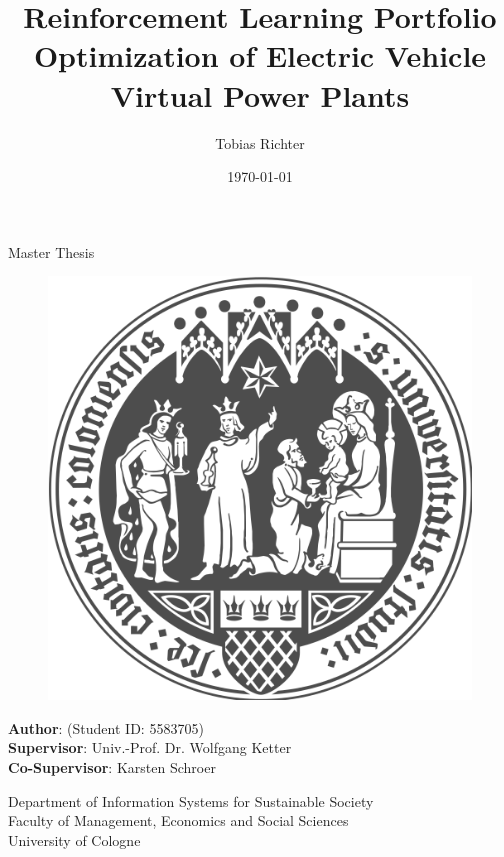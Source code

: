 \documentclass[a4paper, 12pt]{article}
\author{Tobias Richter}
\date{\today}
\title{Reinforcement Learning Portfolio Optimization of Electric Vehicle Virtual Power Plants}
\newcommand{\studentID}{5583705}
\newcommand{\thesistype}{Master Thesis}
\newcommand{\supervisor}{Univ.-Prof. Dr. Wolfgang Ketter}
\newcommand{\cosupervisor}{Karsten Schroer}
\begin{document}
\makeatletter
\begin{titlepage}
    \begin{center}
        \vspace*{1cm}

        \Large
        \textbf{\@title{}}

        \vspace{1.5cm}

        \thesistype{}

        \vspace{1cm}

        \begin{figure}[htbp]
             \centering
             \includegraphics[width=.5\linewidth]{./fig/UoC-logo.png}
        \end{figure}

        \vspace{1cm}

        \large
        \textbf{Author}: \@author{} (Student ID: \studentID{})\\
        \large
        \textbf{Supervisor}: \supervisor{}\\
        \large
        \textbf{Co-Supervisor}: \cosupervisor{}

        \vspace{1cm}
        \large
        Department of Information Systems for Sustainable Society\\
        Faculty of Management, Economics and Social Sciences\\
        University of Cologne\\

        \vspace{1cm}
        \@date{}

    \end{center}
\end{titlepage}
\makeatother
\clearpage
\thispagestyle{empty}
\end{document}
